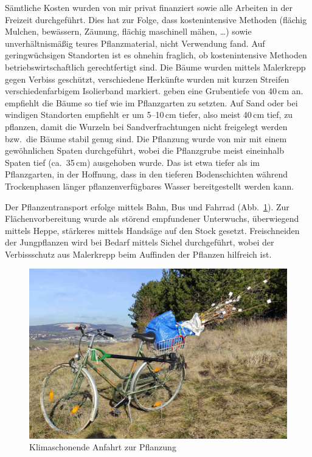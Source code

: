 \documentclass[twocolumn]{scrartcl}
\begin{document}
Sämtliche Kosten wurden von mir privat finanziert sowie alle Arbeiten
in der Freizeit durchgeführt. Dies hat zur Folge, dass kostenintensive
Methoden (flächig Mulchen, bewässern, Zäunung, flächig maschinell
mähen, \dots) sowie unverhältnismäßig teures Pflanzmaterial, nicht
Verwendung fand. Auf geringwüchsigen Standorten ist es ohnehin
fraglich, ob kostenintensive Methoden betriebswirtschaftlich
gerechtfertigt sind. Die Bäume wurden mittels Malerkrepp gegen Verbiss
geschützt, verschiedene Herkünfte wurden mit kurzen Streifen
verschiedenfarbigem Isolierband markiert.
\citet{ciuvat2022robinieRumaenien} geben eine Grubentiefe von 40\,cm
an. \citet[S.~164--165, 173]{vadas1911robinie} empfiehlt die Bäume so
tief wie im Pflanzgarten zu setzten. Auf Sand oder bei windigen
Standorten empfiehlt er um 5--10\,cm tiefer, also meist 40\,cm tief,
zu pflanzen, damit die Wurzeln bei Sandverfrachtungen nicht freigelegt
werden bzw.\ die Bäume stabil genug sind. Die Pflanzung wurde von mir
mit einem gewöhnlichen Spaten durchgeführt, wobei die Pflanzgrube
meist eineinhalb Spaten tief (ca.~35\,cm) ausgehoben wurde. Das ist
etwa tiefer als im Pflanzgarten, in der Hoffnung, dass in den tieferen
Bodenschichten während Trockenphasen länger pflanzenverfügbares Wasser
bereitgestellt werden kann.

Der Pflanzentransport
erfolge mittels Bahn, Bus und Fahrrad
(Abb.~\ref{fig:fahrradPflanzung}). Zur Flächenvorbereitung wurde als
störend empfundener Unterwuchs, überwiegend mittels Heppe, stärkeres
mittels Handsäge auf den Stock gesetzt. Freischneiden der Jungpflanzen
wird bei Bedarf mittels Sichel durchgeführt, wobei der Verbissschutz
aus Malerkrepp beim Auffinden der Pflanzen hilfreich ist.

\begin{figure}[htbp]
  \centering
  \includegraphics[width=.9\linewidth]{./bild/fahrradPflanzung}
  \caption{Klimaschonende Anfahrt zur Pflanzung}
  \label{fig:fahrradPflanzung}
\end{figure}
\end{document}
